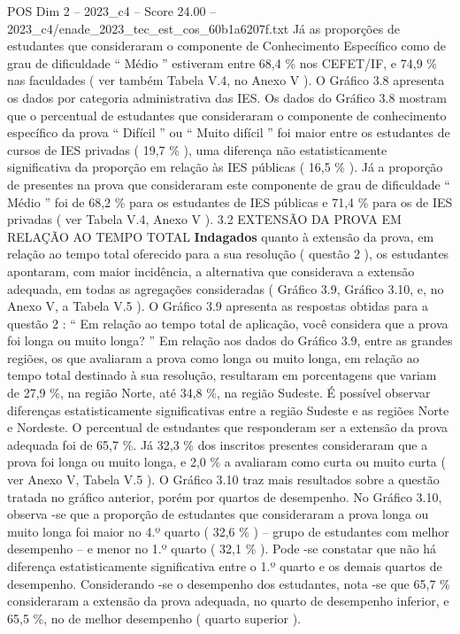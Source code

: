 \begin{textsample}{POS Dim 2 – 2023\_c4 – Score 24.00 – 2023\_c4/enade\_2023\_tec\_est\_cos\_60b1a6207f.txt}
Já as proporções de estudantes que consideraram o componente de Conhecimento Específico como de grau de dificuldade “ Médio ” estiveram entre 68,4 \% nos CEFET/IF, e 74,9 \% nas faculdades ( ver também Tabela V.4, no Anexo V ).
O Gráfico 3.8 apresenta os dados por categoria administrativa das IES.
Os dados do Gráfico 3.8 mostram que o percentual de estudantes que consideraram o componente de conhecimento específico da prova “ Difícil ” ou “ Muito difícil ” foi maior entre os estudantes de cursos de IES privadas ( 19,7 \% ), uma diferença não estatisticamente significativa da proporção em relação às IES públicas ( 16,5 \% ).
Já a proporção de presentes na prova que consideraram este componente de grau de dificuldade “ Médio ” foi de 68,2 \% para os estudantes de IES públicas e 71,4 \% para os de IES privadas ( ver Tabela V.4, Anexo V ). 3.2 EXTENSÃO DA PROVA EM RELAÇÃO AO TEMPO TOTAL \textbf{Indagados} quanto à extensão da prova, em relação ao tempo total oferecido para a sua resolução ( questão 2 ), os estudantes apontaram, com maior incidência, a alternativa que considerava a extensão adequada, em todas as agregações consideradas ( Gráfico 3.9, Gráfico 3.10, e, no Anexo V, a Tabela V.5 ).
O Gráfico 3.9 apresenta as respostas obtidas para a questão 2 : “ Em relação ao tempo total de aplicação, você considera que a prova foi longa ou muito longa? ” Em relação aos dados do Gráfico 3.9, entre as grandes regiões, os que avaliaram a prova como longa ou muito longa, em relação ao tempo total destinado à sua resolução, resultaram em porcentagens que variam de 27,9 \%, na região Norte, até 34,8 \%, na região Sudeste.
É possível observar diferenças estatisticamente significativas entre a região Sudeste e as regiões Norte e Nordeste.
O percentual de estudantes que responderam ser a extensão da prova adequada foi de 65,7 \%.
Já 32,3 \% dos inscritos presentes consideraram que a prova foi longa ou muito longa, e 2,0 \% a avaliaram como curta ou muito curta ( ver Anexo V, Tabela V.5 ).
O Gráfico 3.10 traz mais resultados sobre a questão tratada no gráfico anterior, porém por quartos de desempenho.
No Gráfico 3.10, observa -se que a proporção de estudantes que consideraram a prova longa ou muito longa foi maior no 4.º quarto ( 32,6 \% ) – grupo de estudantes com melhor desempenho – e menor no 1.º quarto ( 32,1 \% ).
Pode -se constatar que não há diferença estatisticamente significativa entre o 1.º quarto e os demais quartos de desempenho.
Considerando -se o desempenho dos estudantes, nota -se que 65,7 \% consideraram a extensão da prova adequada, no quarto de desempenho inferior, e 65,5 \%, no de melhor desempenho ( quarto superior ).

\end{textsample}

